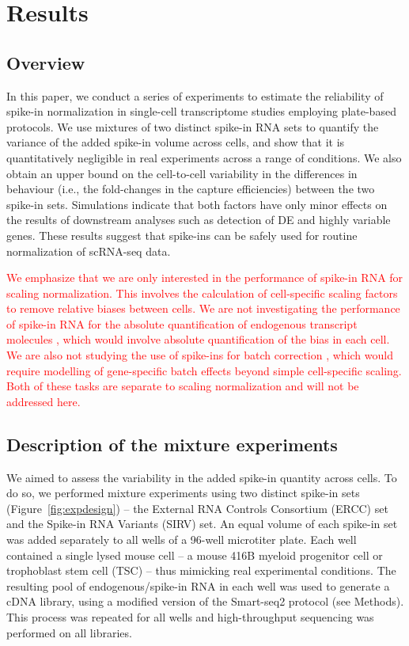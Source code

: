 \documentclass{article}
\newcommand{\revised}[1]{\textcolor{red}{#1}}
\begin{document}
\section*{Results}

\subsection*{Overview}
In this paper, we conduct a series of experiments to estimate the reliability of spike-in normalization in single-cell transcriptome studies employing plate-based protocols.
We use mixtures of two distinct spike-in RNA sets to quantify the variance of the added spike-in volume across cells, 
and show that it is quantitatively negligible in real experiments across a range of conditions. 
We also obtain an upper bound on the cell-to-cell variability in the differences in behaviour (i.e., the fold-changes in the capture efficiencies) between the two spike-in sets.
Simulations indicate that both factors have only minor effects on the results of downstream analyses such as detection of DE and highly variable genes.
These results suggest that spike-ins can be safely used for routine normalization of scRNA-seq data.

\revised{We emphasize that we are only interested in the performance of spike-in RNA for scaling normalization.
This involves the calculation of cell-specific scaling factors to remove relative biases between cells.
We are not investigating the performance of spike-in RNA for the absolute quantification of endogenous transcript molecules \autocite{svensson2017power},
which would involve absolute quantification of the bias in each cell.
We are also not studying the use of spike-ins for batch correction \autocite{tung2016batch}, which would require modelling of gene-specific batch effects beyond simple cell-specific scaling.
Both of these tasks are separate to scaling normalization and will not be addressed here.
}

\subsection*{Description of the mixture experiments}
We aimed to assess the variability in the added spike-in quantity across cells.
To do so, we performed mixture experiments using two distinct spike-in sets (Figure~\ref{fig:expdesign}) -- the External RNA Controls Consortium (ERCC) set and the Spike-in RNA Variants (SIRV) set.
An equal volume of each spike-in set was added separately to all wells of a 96-well microtiter plate.
Each well contained a single lysed mouse cell -- a mouse 416B myeloid progenitor cell or trophoblast stem cell (TSC) -- thus mimicking real experimental conditions.
The resulting pool of endogenous/spike-in RNA in each well was used to generate a cDNA library, using a modified version of the Smart-seq2 protocol (see Methods).
This process was repeated for all wells and high-throughput sequencing was performed on all libraries.
\end{document}
